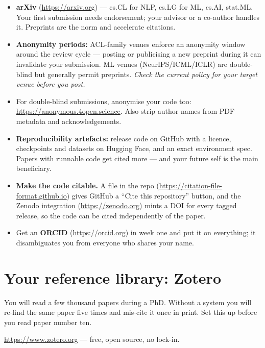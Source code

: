 \documentclass[11pt,a4paper]{article}
\begin{document}
\begin{itemize}
  \item \textbf{arXiv} (\url{https://arxiv.org}) --- cs.CL for NLP, cs.LG for
        ML, cs.AI, stat.ML. Your first submission needs endorsement; your
        advisor or a co-author handles it. Preprints are the norm and
        accelerate citations.
  \item \textbf{Anonymity periods:} ACL-family venues enforce an anonymity
        window around the review cycle --- posting or publicising a new
        preprint during it can invalidate your submission. ML venues
        (NeurIPS/ICML/ICLR) are double-blind but generally permit preprints.
        \emph{Check the current policy for your target venue before you post.}
  \item For double-blind submissions, anonymise your code too:
        \url{https://anonymous.4open.science}. Also strip author names from
        PDF metadata and acknowledgements.
  \item \textbf{Reproducibility artefacts:} release code on GitHub with a
        licence, checkpoints and datasets on Hugging Face, and an
        exact environment spec. Papers with runnable code get cited more ---
        and your future self is the main beneficiary.
  \item \textbf{Make the code citable.} A  file in the
        repo (\url{https://citation-file-format.github.io}) gives GitHub a
        ``Cite this repository'' button, and the Zenodo integration
        (\url{https://zenodo.org}) mints a DOI for every tagged release, so
        the code can be cited independently of the paper.
  \item Get an \textbf{ORCID} (\url{https://orcid.org}) in week one and put it
        on everything; it disambiguates you from everyone who shares your name.
\end{itemize}

\section{Your reference library: Zotero}
\label{sec:zotero}

You will read a few thousand papers during a PhD. Without a system you will
re-find the same paper five times and mis-cite it once in print. Set this up
before you read paper number ten.

\url{https://www.zotero.org} --- free, open source, no lock-in.
\end{document}
